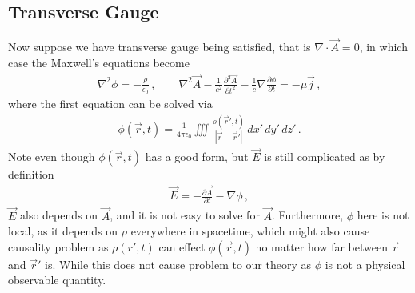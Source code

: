 \documentclass[11pt, onesided]{book}
\theoremstyle{break}
\theoremstyle{break}
\newcommand{\pd}{\partial}
\begin{document}
\subsection{Transverse Gauge}
Now suppose we have transverse gauge being satisfied, that is $\nabla \cdot \vec{A} = 0$, in which case the Maxwell's equations become
\begin{align*}
\nabla^2 \phi = -\frac{\rho}{\epsilon_0}\,,\qquad
\nabla^2 \vec{A} - \frac{1}{c^2}\frac{\pd^2 \vec{A}}{\pd t^2}-\frac{1}{c}\nabla \frac{\pd \phi}{\pd t} = -\mu \vec{j}\,,
\end{align*}
where the first equation can be solved via
\begin{align*}
\phi(\vec{r},t) = \frac{1}{4\pi \epsilon_0}\iiint \frac{\rho(\vec{r}',t)}{|\vec{r}-\vec{r}'|} \,dx'\,dy'\,dz'\,.
\end{align*}
Note even though $\phi(\vec{r},t)$ has a good form, but $\vec{E}$ is still complicated as by definition
\begin{align*}
\vec{E} = -\frac{\pd \vec{A}}{\pd t}- \nabla \phi\,,
\end{align*}
$\vec{E}$ also depends on $\vec{A}$, and it is not easy to solve for $\vec{A}$. Furthermore, $\phi$ here is not local, as it depends on $\rho$ everywhere in spacetime, which might also cause causality problem as $\rho(r',t)$ can effect $\phi(\vec{r},t)$ no matter how far between $\vec{r}$ and  $\vec{r}'$ is. While this does not cause problem to our theory as $\phi$ is not a physical observable quantity. \\
\end{document}
